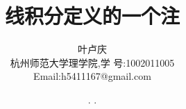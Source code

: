 \documentclass[a4paper, 12pt]{article} %
\makeatletter
\renewcommand{\maketitle}{ %
  \renewcommand\refname{参考文献}
  \newcommand{\D}{\displaystyle}\newcommand{\ri}{\Rightarrow}
  \newcommand{\ds}{\displaystyle} \renewcommand{\ni}{\noindent}
  \newcommand{\pa}{\partial} \newcommand{\Om}{\Omega}
  \newcommand{\om}{\omega} \newcommand{\sik}{\sum_{i=1}^k}
  \newcommand{\vov}{\Vert\omega\Vert} \newcommand{\Umy}{U_{\mu_i,y^i}}
  \newcommand{\lamns}{\lambda_n^{^{\scriptstyle\sigma}}}
  \newcommand{\chiomn}{\chi_{_{\Omega_n}}}
  \newcommand{\ullim}{\underline{\lim}} \newcommand{\bsy}{\boldsymbol}
  \newcommand{\mvb}{\mathversion{bold}} \newcommand{\la}{\lambda}
  \newcommand{\La}{\Lambda} \newcommand{\va}{\varepsilon}
  \newcommand{\be}{\beta} \newcommand{\al}{\alpha}
  \newcommand{\dis}{\displaystyle} \newcommand{\R}{{\mathbb R}}
  \newcommand{\N}{{\mathbb N}} \newcommand{\cF}{{\mathcal F}}
  \newcommand{\gB}{{\mathfrak B}} \newcommand{\eps}{\epsilon}
  \begin{flushright} %
    {\LARGE\@title} %
    
    \vspace{50pt} %
    
    {\large\@author} %
    \\\@date %
    
    \vspace{40pt} %
  \end{flushright}
}
\makeatother
\begin{document}
\title{\textbf{线积分定义的一个注}}
\author{\small{叶卢庆}\\{\small{杭州师范大学理学院,学
      号:1002011005}}\\{\small{Email:h5411167@gmail.com}}} %
\renewcommand{\today}{\number\year. \number\month. \number\day}
\date{\today} %
  
  
\maketitle %
  
  
  
  
  
  
  
\end{document}
